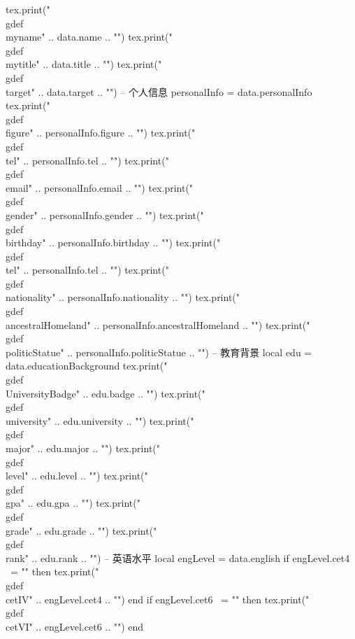 \documentclass[10pt, a4paper, oneside]{ctexart}
\begin{document}
\begin{luacode}
tex.print("\\gdef\\myname{" .. data.name .. "}") 
tex.print("\\gdef\\mytitle{" .. data.title .. "}")
tex.print("\\gdef\\target{" .. data.target .. "}")
-- 个人信息
personalInfo = data.personalInfo
tex.print("\\gdef\\figure{" .. personalInfo.figure .. "}")
tex.print("\\gdef\\tel{" .. personalInfo.tel .. "}")
tex.print("\\gdef\\email{" .. personalInfo.email .. "}")
tex.print("\\gdef\\gender{" .. personalInfo.gender .. "}")
tex.print("\\gdef\\birthday{" .. personalInfo.birthday .. "}")
tex.print("\\gdef\\tel{" .. personalInfo.tel .. "}")
tex.print("\\gdef\\nationality{" .. personalInfo.nationality .. "}")
tex.print("\\gdef\\ancestralHomeland{" .. personalInfo.ancestralHomeland .. "}")
tex.print("\\gdef\\politicStatue{" .. personalInfo.politicStatue .. "}")
-- 教育背景
local edu = data.educationBackground
tex.print("\\gdef\\UniversityBadge{" .. edu.badge .. "}")
tex.print("\\gdef\\university{" .. edu.university .. "}")
tex.print("\\gdef\\major{" .. edu.major .. "}")
tex.print("\\gdef\\level{" .. edu.level .. "}")
tex.print("\\gdef\\gpa{" .. edu.gpa .. "}")
tex.print("\\gdef\\grade{" .. edu.grade .. "}")
tex.print("\\gdef\\rank{" .. edu.rank .. "}")
-- 英语水平
local engLevel = data.english
if engLevel.cet4 ~= "" then
    tex.print("\\gdef\\cetIV{" .. engLevel.cet4 .. "}")
end
if engLevel.cet6 ~= "" then
    tex.print("\\gdef\\cetVI{" .. engLevel.cet6 .. "}")
end

\end{luacode}
\end{document}
